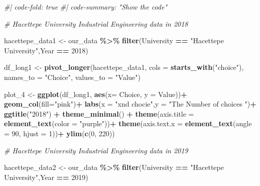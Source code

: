 \documentclass[
]{article}
\newenvironment{Shaded}{\begin{snugshade}}{\end{snugshade}}
\newcommand{\AttributeTok}[1]{\textcolor[rgb]{0.13,0.29,0.53}{#1}}
\newcommand{\CommentTok}[1]{\textcolor[rgb]{0.56,0.35,0.01}{\textit{#1}}}
\newcommand{\DecValTok}[1]{\textcolor[rgb]{0.00,0.00,0.81}{#1}}
\newcommand{\FunctionTok}[1]{\textcolor[rgb]{0.13,0.29,0.53}{\textbf{#1}}}
\newcommand{\NormalTok}[1]{#1}
\newcommand{\OtherTok}[1]{\textcolor[rgb]{0.56,0.35,0.01}{#1}}
\newcommand{\SpecialCharTok}[1]{\textcolor[rgb]{0.81,0.36,0.00}{\textbf{#1}}}
\newcommand{\StringTok}[1]{\textcolor[rgb]{0.31,0.60,0.02}{#1}}
\begin{document}
\begin{Shaded}
\begin{Highlighting}[]
\CommentTok{\#| code{-}fold: true}
\CommentTok{\#| code{-}summary: "Show the code"}

\CommentTok{\# Hacettepe University Industrial Engineering data in 2018}

\NormalTok{hacettepe\_data1 }\OtherTok{\textless{}{-}}\NormalTok{ our\_data }\SpecialCharTok{\%\textgreater{}\%} \FunctionTok{filter}\NormalTok{(University }\SpecialCharTok{==} \StringTok{"Hacettepe University"}\NormalTok{,Year }\SpecialCharTok{==} \DecValTok{2018}\NormalTok{)}


\NormalTok{df\_long1 }\OtherTok{\textless{}{-}} \FunctionTok{pivot\_longer}\NormalTok{(hacettepe\_data1, }\AttributeTok{cols =} \FunctionTok{starts\_with}\NormalTok{(}\StringTok{"choice"}\NormalTok{),}
                        \AttributeTok{names\_to =} \StringTok{"Choice"}\NormalTok{, }\AttributeTok{values\_to =} \StringTok{"Value"}\NormalTok{)}

\NormalTok{plot\_4 }\OtherTok{\textless{}{-}} \FunctionTok{ggplot}\NormalTok{(df\_long1, }\FunctionTok{aes}\NormalTok{(}\AttributeTok{x=}\NormalTok{ Choice, }\AttributeTok{y =}\NormalTok{ Value))}\SpecialCharTok{+}
  \FunctionTok{geom\_col}\NormalTok{(}\AttributeTok{fill=}\StringTok{"pink"}\NormalTok{)}\SpecialCharTok{+}
  \FunctionTok{labs}\NormalTok{(}\AttributeTok{x =} \StringTok{"xnd chocie"}\NormalTok{,}\AttributeTok{y =} \StringTok{"The Number of choices "}\NormalTok{)}\SpecialCharTok{+}
  \FunctionTok{ggtitle}\NormalTok{(}\StringTok{"2018"}\NormalTok{) }\SpecialCharTok{+}
  \FunctionTok{theme\_minimal}\NormalTok{() }\SpecialCharTok{+}
  \FunctionTok{theme}\NormalTok{(}\AttributeTok{axis.title =} \FunctionTok{element\_text}\NormalTok{(}\AttributeTok{color =} \StringTok{"purple"}\NormalTok{))}\SpecialCharTok{+}
  \FunctionTok{theme}\NormalTok{(}\AttributeTok{axis.text.x =} \FunctionTok{element\_text}\NormalTok{(}\AttributeTok{angle =} \DecValTok{90}\NormalTok{, }\AttributeTok{hjust =} \DecValTok{1}\NormalTok{))}\SpecialCharTok{+}
  \FunctionTok{ylim}\NormalTok{(}\FunctionTok{c}\NormalTok{(}\DecValTok{0}\NormalTok{, }\DecValTok{220}\NormalTok{))}

\CommentTok{\# Hacettepe University Industrial Engineering data in 2019}

\NormalTok{hacettepe\_data2 }\OtherTok{\textless{}{-}}\NormalTok{ our\_data }\SpecialCharTok{\%\textgreater{}\%} \FunctionTok{filter}\NormalTok{(University }\SpecialCharTok{==} \StringTok{"Hacettepe University"}\NormalTok{,Year }\SpecialCharTok{==} \DecValTok{2019}\NormalTok{)}


\end{Highlighting}
\end{Shaded}
\end{document}

